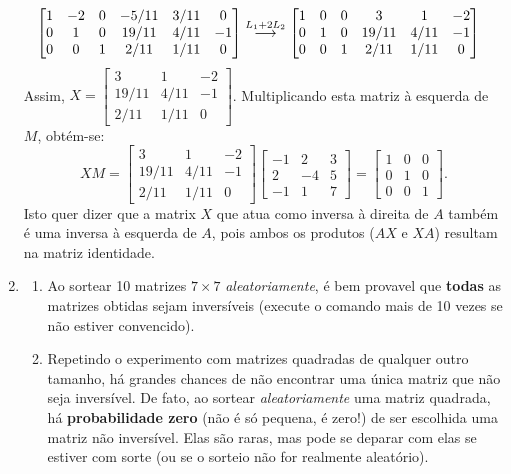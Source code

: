 \documentclass[12pt,a4paper]{article}
\newcommand{\grstep}[2][\relax]{%
   \ensuremath{\mathrel{
       {\mathop{\longrightarrow}\limits^{#2\mathstrut}_{
                                     \begin{subarray}{l} #1 \end{subarray}}}}}}
\begin{document}
\begin{enumerate}
\begin{align*}
&
\begin{bmatrix}
 1 & -2 & 0 & -5/11 & 3/11 &  0\\
 0 &  1 & 0 & 19/11 & 4/11 & -1\\
 0 &  0 & 1 &  2/11 & 1/11 &  0
\end{bmatrix}
\grstep{ L_1 + 2 L_2 }
\begin{bmatrix}
 1 & 0 & 0 & 3 & 1 & -2\\
 0 & 1 & 0 & 19/11 & 4/11 & -1\\
 0 & 0 & 1 &  2/11 & 1/11 &  0
\end{bmatrix}
\end{align*}
Assim,
$X = \begin{bmatrix}
    3 &    1 & -2\\
19/11 & 4/11 & -1\\
 2/11 & 1/11 &  0
\end{bmatrix}$. Multiplicando esta matriz à esquerda de $M$, obtém-se:
\[
XM =
\begin{bmatrix}
    3 &    1 & -2\\
19/11 & 4/11 & -1\\
 2/11 & 1/11 &  0
\end{bmatrix}
\begin{bmatrix}
-1 &  2 & 3 \\
 2 & -4 & 5 \\
-1 &  1 & 7
\end{bmatrix}
=\begin{bmatrix}
1 & 0 & 0 \\
0 & 1 & 0 \\
0 & 0 & 1
\end{bmatrix}.
\]
Isto quer dizer que a matrix $X$ que atua como inversa à direita de $A$ também é uma inversa à esquerda de $A$, pois ambos os produtos ($AX$ e $XA$) resultam na matriz identidade.


\item 
\begin{enumerate}
\item Ao sortear 10 matrizes $7 \times 7$ \textit{aleatoriamente}, é bem provavel que \textbf{todas} as matrizes obtidas sejam inversíveis (execute o comando mais de 10 vezes se não estiver convencido).
\item Repetindo o experimento com matrizes quadradas de qualquer outro tamanho, há grandes chances de não encontrar uma única matriz que não seja inversível. De fato, ao sortear \textit{aleatoriamente} uma matriz quadrada, há \textbf{probabilidade zero} (não é só pequena, é zero!) de ser escolhida uma matriz não inversível. Elas são raras, mas pode se deparar com elas se estiver com sorte (ou se o sorteio não for realmente aleatório).


\end{enumerate}
\end{enumerate}
\end{document}
